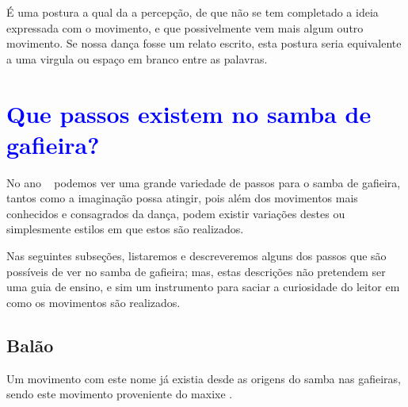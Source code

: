 \begin{definition} 
\label{def:PosturaTransicao}
É uma postura a qual da a percepção, 
de que não se tem completado a ideia expressada com o movimento, e que possivelmente vem mais algum outro movimento.
Se nossa dança fosse um relato escrito, esta postura seria equivalente a uma virgula ou espaço em branco entre as palavras.
\end{definition}


\section{\textcolor{blue}{Que passos existem no samba de gafieira?}}

No ano \AnoLivro~ podemos ver uma grande variedade de passos para o samba de gafieira,
tantos como a imaginação possa atingir, pois além dos movimentos mais conhecidos e  consagrados da dança,
podem existir variações  destes ou simplesmente estilos em que estos são realizados. 



Nas seguintes subseções, listaremos e descreveremos 
alguns dos passos que são possíveis de ver no samba de gafieira;
mas, estas descrições não pretendem ser uma guia de ensino,
e sim um instrumento para saciar a curiosidade do leitor em como os movimentos são realizados.\\


\subsection{Balão} 
\label{def:PassoBalao}
Um movimento com este nome já existia desde as origens do samba nas gafieiras, 
sendo este movimento proveniente do maxixe \cite[pp. 142]{perna2002samba} 
\cite[pp. 93]{efege1974maxixe} \cite[pp. 465]{marcondes1977enciclopedia}.



